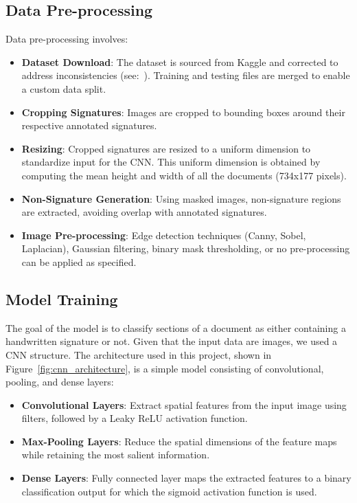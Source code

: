 \documentclass[a4paper,12pt]{article}
\begin{document}
\subsection{Data Pre-processing}
Data pre-processing involves:
\begin{itemize}
    \item \textbf{Dataset Download}: The dataset is sourced from Kaggle\cite{dataset} and corrected to address inconsistencies (see:~\cite{dataset_fix}). Training and testing files are merged to enable a custom data split.
    \item \textbf{Cropping Signatures}: Images are cropped to bounding boxes around their respective annotated signatures.
    \item \textbf{Resizing}: Cropped signatures are resized to a uniform dimension to standardize input for the CNN. This uniform dimension is obtained by computing the mean height and width of all the documents (734x177 pixels).
    \item \textbf{Non-Signature Generation}: Using masked images, non-signature regions are extracted, avoiding overlap with annotated signatures.
    \item \textbf{Image Pre-processing}: Edge detection techniques (Canny, Sobel, Laplacian), Gaussian filtering, binary mask thresholding, or no pre-processing can be applied as specified.
\end{itemize}

\subsection{Model Training}

The goal of the model is to classify sections of a document as either containing a handwritten signature or not. Given that the input data are images, we used a CNN structure. The architecture used in this project, shown in Figure~\ref{fig:cnn_architecture}, is a simple model consisting of convolutional, pooling, and dense layers: \begin{itemize} \item \textbf{Convolutional Layers}: Extract spatial features from the input image using filters, followed by a Leaky ReLU activation function. \item \textbf{Max-Pooling Layers}: Reduce the spatial dimensions of the feature maps while retaining the most salient information. \item \textbf{Dense Layers}: Fully connected layer maps the extracted features to a binary classification output for which the sigmoid activation function is used. \end{itemize}
\end{document}
